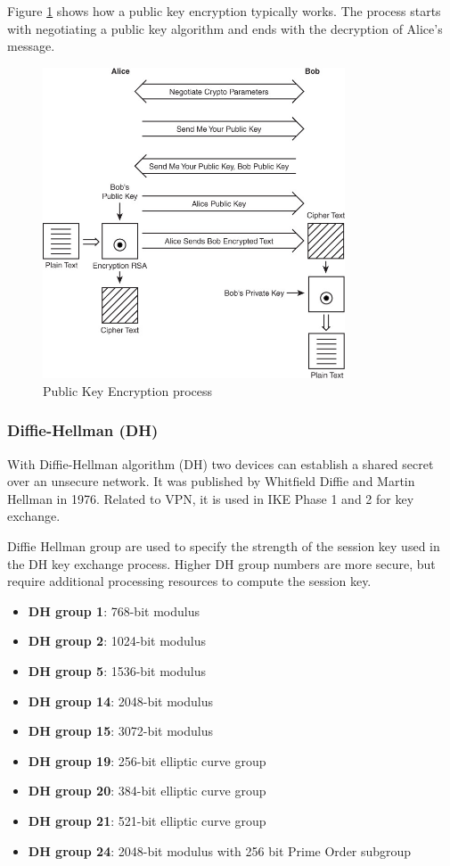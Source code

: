 \documentclass[a4paper]{report}
\begin{document}
Figure \ref{fig:asym_alg} shows how a public key encryption typically works. The process starts with negotiating a public key algorithm and ends with the decryption of Alice's message.
\begin{figure}[htb]
	\includegraphics[keepaspectratio,width=0.8\textwidth]{asym_alg.jpg}
	\caption{Public Key Encryption process}
	\label{fig:asym_alg}
\end{figure}

\subsubsection{Diffie-Hellman (DH)}
\label{sssec:diffie-hellman}
With Diffie-Hellman algorithm (DH) two devices can establish a shared secret over an unsecure network. It was published by Whitfield Diffie and Martin Hellman in 1976. Related to VPN, it is used in IKE Phase 1 and 2 for key exchange. 

Diffie Hellman group are used to specify the strength of the session key used in the DH key exchange process. Higher DH group numbers are more secure, but require additional processing resources to compute the session key. \parencite{JajishThomas}
\begin{itemize}
	\item \textbf{DH group 1}: 768-bit modulus
	\item \textbf{DH group 2}: 1024-bit modulus
	\item \textbf{DH group 5}: 1536-bit modulus
	\item \textbf{DH group 14}: 2048-bit modulus
	\item \textbf{DH group 15}: 3072-bit modulus
	\item \textbf{DH group 19}: 256-bit elliptic curve group
	\item \textbf{DH group 20}: 384-bit elliptic curve group
	\item \textbf{DH group 21}: 521-bit elliptic curve group
	\item \textbf{DH group 24}: 2048-bit modulus with 256 bit Prime Order subgroup
\end{itemize}
\end{document}
